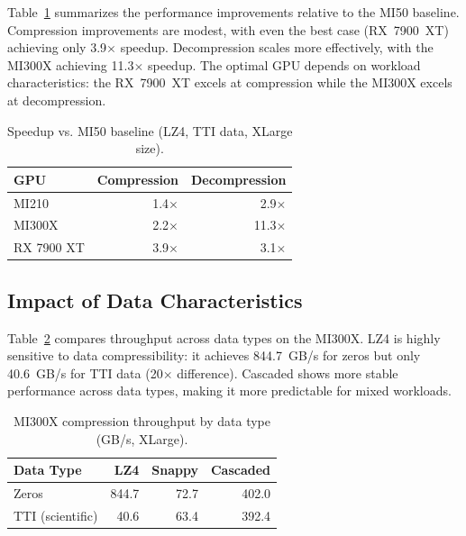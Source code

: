 \documentclass[runningheads]{llncs}
\begin{document}
Table~\ref{tab:speedup} summarizes the performance improvements relative to the MI50 baseline. Compression improvements are modest, with even the best case (RX~7900~XT) achieving only 3.9$\times$ speedup. Decompression scales more effectively, with the MI300X achieving 11.3$\times$ speedup. The optimal GPU depends on workload characteristics: the RX~7900~XT excels at compression while the MI300X excels at decompression.

\begin{table}[t]
\centering
\caption{Speedup vs. MI50 baseline (LZ4, TTI data, XLarge size).}
\label{tab:speedup}
\begin{tabular}{lrr}
\toprule
\textbf{GPU} & \textbf{Compression} & \textbf{Decompression} \\
\midrule
MI210 & 1.4$\times$ & 2.9$\times$ \\
MI300X & 2.2$\times$ & 11.3$\times$ \\
RX 7900 XT & 3.9$\times$ & 3.1$\times$ \\
\bottomrule
\end{tabular}
\end{table}

\subsection{Impact of Data Characteristics}

Table~\ref{tab:data_impact} compares throughput across data types on the MI300X. LZ4 is highly sensitive to data compressibility: it achieves 844.7~GB/s for zeros but only 40.6~GB/s for TTI data (20$\times$ difference). Cascaded shows more stable performance across data types, making it more predictable for mixed workloads.

\begin{table}[t]
\centering
\caption{MI300X compression throughput by data type (GB/s, XLarge).}
\label{tab:data_impact}
\begin{tabular}{lrrr}
\toprule
\textbf{Data Type} & \textbf{LZ4} & \textbf{Snappy} & \textbf{Cascaded} \\
\midrule
Zeros & 844.7 & 72.7 & 402.0 \\
TTI (scientific) & 40.6 & 63.4 & 392.4 \\
\bottomrule
\end{tabular}
\end{table}

\end{document}
